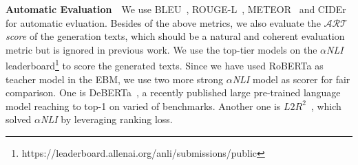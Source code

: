 \noindent\textbf{Automatic Evaluation}~~We use BLEU~\citep{bleu}, ROUGE-L~\citep{lin-2004-rouge}, METEOR~\citep{banerjee-lavie-2005-meteor} and CIDEr~\citep{cider} 
for automatic evluation. 
Besides of the above metrics, we also evaluate the $\mathcal{ART}$ \textit{score} of the generation texts,
which should be a natural and coherent evaluation metric but is ignored in previous work.
We use the top-tier models on the $\alpha$\textit{NLI} leaderboard\footnote{https://leaderboard.allenai.org/anli/submissions/public}
to score the generated texts. Since we have used RoBERTa as teacher model in the EBM, we use two more strong
$\alpha$\textit{NLI} model as scorer for fair comparison.
One is DeBERTa~\citep{deberta}, a recently published large pre-trained language model reaching to top-1 on
varied of benchmarks. Another one is $L2R^2$~\citep{l2r2}, which solved $\alpha$\textit{NLI}
by leveraging ranking loss.%
